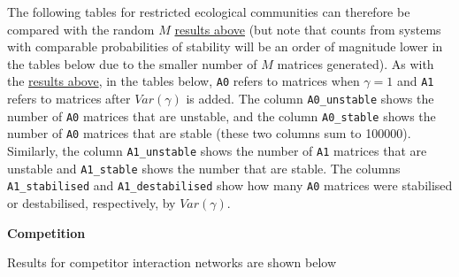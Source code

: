 \documentclass[]{article}
\begin{document}
The following tables for restricted ecological communities can therefore
be compared with the random \(M\) \protect\hyperlink{IncrS}{results
above} (but note that counts from systems with comparable probabilities
of stability will be an order of magnitude lower in the tables below due
to the smaller number of \(M\) matrices generated). As with the
\protect\hyperlink{IncrS}{results above}, in the tables below,
\texttt{A0} refers to matrices when \(\gamma = 1\) and \texttt{A1}
refers to matrices after \(Var(\gamma)\) is added. The column
\texttt{A0\_unstable} shows the number of \texttt{A0} matrices that are
unstable, and the column \texttt{A0\_stable} shows the number of
\texttt{A0} matrices that are stable (these two columns sum to 100000).
Similarly, the column \texttt{A1\_unstable} shows the number of
\texttt{A1} matrices that are unstable and \texttt{A1\_stable} shows the
number that are stable. The columns \texttt{A1\_stabilised} and
\texttt{A1\_destabilised} show how many \texttt{A0} matrices were
stabilised or destabilised, respectively, by \(Var(\gamma)\).

\textbf{Competition}

Results for competitor interaction networks are shown below
\end{document}
